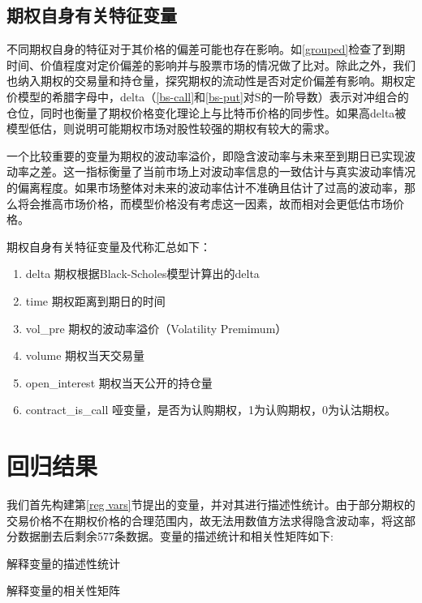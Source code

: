 \subsection{期权自身有关特征变量}
\par{不同期权自身的特征对于其价格的偏差可能也存在影响。如\ref{grouped}检查了到期时间、价值程度对定价偏差的影响并与股票市场的情况做了比对。除此之外，我们也纳入期权的交易量和持仓量，探究期权的流动性是否对定价偏差有影响。期权定价模型的希腊字母中，delta（\ref{bs-call}和\ref{bs-put}对S的一阶导数）表示对冲组合的仓位，同时也衡量了期权价格变化理论上与比特币价格的同步性。如果高delta被模型低估，则说明可能期权市场对股性较强的期权有较大的需求。}
\par{
    一个比较重要的变量为期权的波动率溢价，即隐含波动率与未来至到期日已实现波动率之差。这一指标衡量了当前市场上对波动率信息的一致估计与真实波动率情况的偏离程度。如果市场整体对未来的波动率估计不准确且估计了过高的波动率，那么将会推高市场价格，而模型价格没有考虑这一因素，故而相对会更低估市场价格。
}
\par{
    期权自身有关特征变量及代称汇总如下：
}
\begin{enumerate}[(1)]
\item delta 期权根据Black-Scholes模型计算出的delta
\item time 期权距离到期日的时间
\item vol\_pre 期权的波动率溢价（Volatility Premimum）
\item volume 期权当天交易量                                     
\item open\_interest 期权当天公开的持仓量 
\item contract\_is\_call 哑变量，是否为认购期权，1为认购期权，0为认沽期权。 
\end{enumerate}

\section{回归结果}  
我们首先构建第\ref{reg vars}节提出的变量，并对其进行描述性统计。由于部分期权的交易价格不在期权价格的合理范围内，故无法用数值方法求得隐含波动率，将这部分数据删去后剩余577条数据。变量的描述统计和相关性矩阵如下:
\newpage
{}
\begin{landscape} 
\begin{table}[H]
\caption{解释变量的描述性统计}
\resizebox{\linewidth}{!}{

}
\end{table}
\begin{table}[H]
\caption{解释变量的相关性矩阵}
\resizebox{\linewidth}{!}{    }
\end{table}    
\end{landscape}

